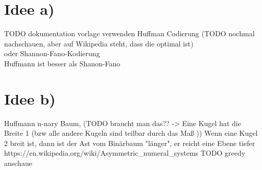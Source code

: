 \documentclass[11pt]{article}
\begin{document}
\section{Idee a)}
TODO dokumentation vorlage verwenden
Huffman Codierung (TODO nochmal nachschauen, aber auf Wikipedia steht, dass die optimal ist)\\
oder Shannon-Fano-Kodierung \\
    Huffmann ist besser als Shanon-Fano \\

\section{Idee b)}
Huffmann n-nary Baum, (TODO braucht man das?? -> Eine Kugel hat die Breite 1 (bzw alle andere Kugeln sind teilbar durch
das Maß )) Wenn eine Kugel 2 breit ist, dann ist der Ast vom Binärbaum "länger", er reicht eine Ebene tiefer
https://en.wikipedia.org/wiki/Asymmetric_numeral_systems
    TODO greedy anschaue
\end{document}
